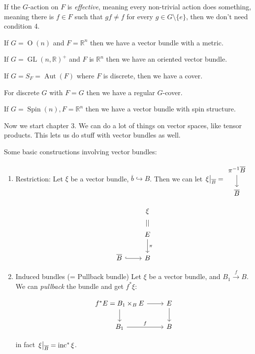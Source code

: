 \documentclass{article}
\theoremstyle{definition}
\begin{document}
    If the \(G\)-action on \(F\) is \textit{effective}, meaning every non-trivial action does something, meaning there is \(f\in F\) such that \(gf\neq f\) for every \(g\in G \setminus \{ e \}\), then we don't need condition 4.

    If \(G=\operatorname{O}(n)\) and \(F=\mathbb{R}^n\) then we have a vector bundle with a metric.
    
    If \(G = \operatorname{GL}(n,\mathbb{R})^+\) and \(F\) is \(\mathbb{R}^n\) then we have an oriented vector bundle.

    If \(G = S_F = \operatorname{Aut}(F)\) where \(F\) is discrete,  then we have a cover.

    For discrete \(G\) with \(F = G\) then we have a regular \(G\)-cover.

    If \(G = \operatorname{Spin}(n), F = \mathbb{R}^n\) then we have a vector bundle with spin structure. 

    Now we start chapter 3. We can do a lot of things on vector spaces, like tensor products. This lets us do stuff with vector bundles as well.

    Some basic constructions involving vector bundles:

    \begin{enumerate}[label=\arabic*)]
        \item Restriction: Let \(\xi\) be a vector bundle, \(\overline{b} \hookrightarrow B\). Then we can let \(\eval{\xi}_{\overline{B}}^{} = \begin{tikzcd}
            \pi ^{-1} \overline{B} \ar[d] \\ \overline{B}
        \end{tikzcd}\)  

        \[
            \begin{tikzcd}
                & \xi \ar[d,phantom,"||"] \\ & E \ar[d, "\pi"] \\ \overline{B} \ar[r, hook] & B 
            \end{tikzcd}
        \]

        \item Induced bundles (= Pullback bundle) Let \(\xi\) be a vector bundle, and \(B_1 \xrightarrow{f} B\). We can \textit{pullback} the bundle and get \(f ^{\ast} \xi\):
        
        \[
            \begin{tikzcd}
                f^{\ast} E = B_1 \times_B E \ar[r] \ar[d] & E \ar[d] \\ B_1 \ar[r,"f"] & B
            \end{tikzcd}
        \]

        in fact \(\eval{\xi}_{\overline{B} }^{} = \operatorname{inc}^{\ast} \xi\).
    \end{enumerate} 
\end{document}
